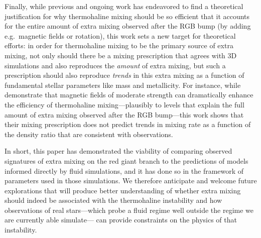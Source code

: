 Finally, while previous and ongoing work has endeavored to find a theoretical justification for why thermohaline mixing should be so efficient that it accounts for the entire amount of extra mixing observed after the RGB bump (by adding e.g.~magnetic fields or rotation), this work sets a new target for theoretical efforts: in order for thermohaline mixing to be the primary source of extra mixing, not only should there be a mixing prescription that agrees with 3D simulations and also reproduces the \textit{amount} of extra mixing, but such a prescription should also reproduce \textit{trends} in this extra mixing as a function of fundamental stellar parameters like mass and metallicity.
For instance, while \citet{harrington} demonstrate that magnetic fields of moderate strength can dramatically enhance the efficiency of thermohaline mixing---plausibly to levels that explain the full amount of extra mixing observed after the RGB bump---this work shows that their mixing prescription does not predict trends in mixing rate as a function of the density ratio that are consistent with observations.

In short, this paper has demonstrated the viability of comparing observed signatures of extra mixing on the red giant branch to the predictions of models informed directly by fluid simulations, and it has done so in the framework of parameters used in those simulations. We therefore anticipate and welcome future explorations that will produce better understanding of 
whether extra mixing should indeed be associated with the thermohaline instability and 
how observations of real stars---which probe a fluid regime well outside the regime we are currently able simulate--- can provide constraints on the physics of that instability.

